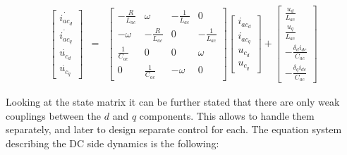     \begin{equation}
        \begin{array}{rcl}
            \begin{bmatrix}
                \dot{i_{ac_d}}\\
                \dot{i_{ac_q}}\\
                \dot{u_{c_d}}\\
                \dot{u_{c_q}}
            \end{bmatrix}&=&
            \begin{bmatrix}
                -\frac{R}{L_{ac}}   &\omega &-\frac{1}{L_{ac}}  &0\\
                -\omega   &-\frac{R}{L_{ac}} &0  &-\frac{1}{L_{ac}}\\
                \frac{1}{C_{ac}}   &0 &0  &\omega\\
                0   &\frac{1}{C_{ac}} &-\omega  &0
            \end{bmatrix}
            \begin{bmatrix}
                i_{ac_d}\\
                i_{ac_q}\\
                u_{c_d}\\
                u_{c_q}
            \end{bmatrix}+
            \begin{bmatrix}
                \frac{u_d}{L_{ac}}\\
                \frac{u_q}{L_{ac}}\\
                -\frac{\delta_di_{dc}}{C_{ac}}\\
                -\frac{\delta_qi_{dc}}{C_{ac}}
            \end{bmatrix}
        \end{array}
        \label{EMPC:equ:mtx_AC}
    \end{equation}

    Looking at the state matrix it can be further stated that there are only weak couplings between the $d$ and $q$ components. This allows to handle them separately, and later to design separate control for each.
    The equation system describing the DC side dynamics is the following:

